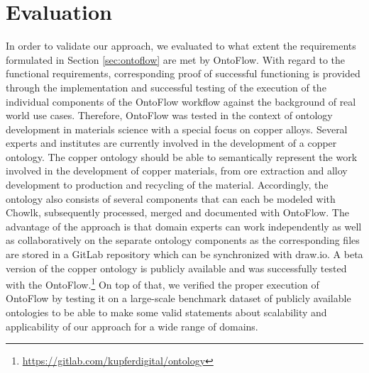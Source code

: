 \documentclass[sigconf]{acmart}
\begin{document}
\section{Evaluation}
\label{sec:eval}
In order to validate our approach, we evaluated to what extent the requirements formulated in Section \ref{sec:ontoflow} are met by OntoFlow. With regard to the functional requirements, corresponding proof of successful functioning is provided through the implementation and successful testing of the execution of the individual components of the OntoFlow workflow against the background of real world use cases. Therefore, OntoFlow was tested in the context of ontology development in materials science with a special focus on copper alloys. Several experts and institutes are currently involved in the development of a copper ontology. The copper ontology should be able to semantically represent the work involved in the development of copper materials, from ore extraction and alloy development to production and recycling of the material. Accordingly, the ontology also consists of several components that can each be modeled with Chowlk, subsequently processed, merged and documented with OntoFlow. The advantage of the approach is that domain experts can work independently as well as collaboratively on the separate ontology components as the corresponding files are stored in a GitLab repository which can be synchronized with draw.io. A beta version of the copper ontology is publicly available and was successfully tested with the OntoFlow.\footnote{\url{https://gitlab.com/kupferdigital/ontology}} 
On top of that, we verified the proper execution of OntoFlow by testing it on a large-scale benchmark dataset of publicly available ontologies to be able to make some valid statements about scalability and applicability of our approach for a wide range of domains. 
\end{document}
